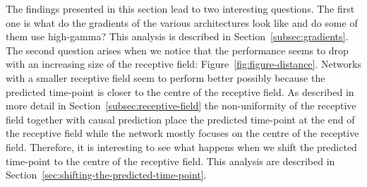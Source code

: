 The findings presented in this section lead to two interesting questions.
The first one  is what do the gradients of the various architectures look like and do some of them use high-gamma?
This analysis is described in Section~\ref{subsec:gradients}.
The second question arises when we notice that the performance seems to drop with an increasing size of the receptive field: Figure~\ref{fig:figure-distance}.
Networks with a smaller receptive field seem to perform better possibly because the predicted time-point is closer to the centre of the receptive field. As described in more detail in Section~\ref{subsec:receptive-field} the non-uniformity of the receptive field together with causal prediction place the predicted time-point at the end of the receptive field while the network mostly focuses on the centre of the receptive field.
Therefore, it is interesting to see what happens when we shift the predicted time-point to the centre of the receptive field.
This analysis are described in Section~\ref{sec:shifting-the-predicted-time-point}.

